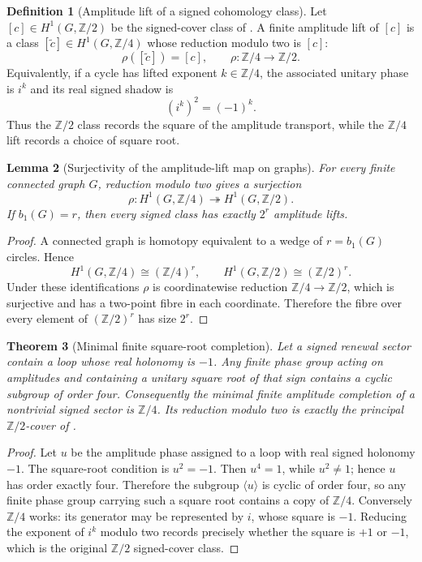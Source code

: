 \documentclass[11pt]{article}
\newtheorem{theorem}{Theorem}[section]
\newtheorem{lemma}[theorem]{Lemma}
\theoremstyle{definition}
\newtheorem{definition}[theorem]{Definition}
\theoremstyle{remark}
\newcommand{\Z}{\mathbb{Z}}
\newcommand{\Ztwo}{\mathbb{Z}/2}
\newcommand{\Zfour}{\mathbb{Z}/4}
\begin{document}
\begin{definition}[Amplitude lift of a signed cohomology class]
\label{def:amplitude-lift}
Let \([c]\in H^1(G,\Ztwo)\) be the signed-cover class of
.  A finite amplitude lift of \([c]\) is a class
\([\widetilde c]\in H^1(G,\Zfour)\) whose reduction modulo two is \([c]\):
\[
  \rho([\widetilde c])=[c],
  \qquad \rho:\Zfour\longrightarrow\Ztwo .
\]
Equivalently, if a cycle has lifted exponent \(k\in\Zfour\), the associated
unitary phase is \(i^k\) and its real signed shadow is
\[
  (i^k)^2=(-1)^k .
\]
Thus the \(\Z/2\) class records the square of the amplitude transport, while the
\(\Z/4\) lift records a choice of square root.
\end{definition}

\begin{lemma}[Surjectivity of the amplitude-lift map on graphs]
\label{lem:z4-lift-surjects}
For every finite connected graph \(G\), reduction modulo two gives a surjection
\[
  \rho:H^1(G,\Zfour)\twoheadrightarrow H^1(G,\Ztwo).
\]
If \(b_1(G)=r\), then every signed class has exactly \(2^r\) amplitude lifts.
\end{lemma}

\begin{proof}
A connected graph is homotopy equivalent to a wedge of \(r=b_1(G)\) circles.
Hence
\[
  H^1(G,\Zfour)\cong(\Zfour)^r,
  \qquad
  H^1(G,\Ztwo)\cong(\Ztwo)^r .
\]
Under these identifications \(\rho\) is coordinatewise reduction
\(\Zfour\to\Ztwo\), which is surjective and has a two-point fibre in each
coordinate.  Therefore the fibre over every element of \((\Ztwo)^r\) has size
\(2^r\).
\end{proof}

\begin{theorem}[Minimal finite square-root completion]
\label{thm:minimal-z4-amplitude-lift}
Let a signed renewal sector contain a loop whose real holonomy is \(-1\).  Any
finite phase group acting on amplitudes and containing a unitary square root of
that sign contains a cyclic subgroup of order four.  Consequently the minimal
finite amplitude completion of a nontrivial signed sector is \(\Zfour\).  Its
reduction modulo two is exactly the principal \(\Ztwo\)-cover of
.
\end{theorem}

\begin{proof}
Let \(u\) be the amplitude phase assigned to a loop with real signed holonomy
\(-1\).  The square-root condition is \(u^2=-1\).  Then \(u^4=1\), while
\(u^2\ne1\); hence \(u\) has order exactly four.  Therefore the subgroup
\(\langle u\rangle\) is cyclic of order four, so any finite phase group carrying
such a square root contains a copy of \(\Zfour\).  Conversely \(\Zfour\) works:
its generator may be represented by \(i\), whose square is \(-1\).  Reducing the
exponent of \(i^k\) modulo two records precisely whether the square is \(+1\) or
\(-1\), which is the original \(\Ztwo\) signed-cover class.
\end{proof}
\end{document}
